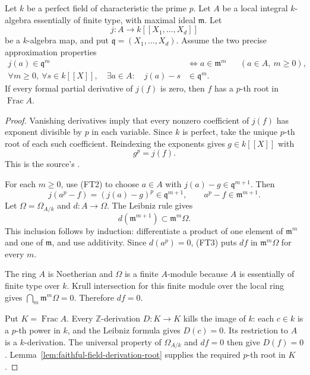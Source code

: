 \begin{srlemma}\label{lem:faithful-local-series-root}
Let \(k\) be a perfect field of characteristic the prime \(p\).
Let \(A\) be a local integral \(k\)-algebra essentially of
finite type, with maximal ideal \(\mathfrak m\).
Let
\[
                   j:A\longrightarrow k[[X_1,\ldots,X_d]]
\]
be a \(k\)-algebra map, and put
\(\mathfrak q=(X_1,\ldots,X_d)\).
Assume the two precise approximation properties
\[
 \begin{aligned}
 j(a)\in\mathfrak q^m
             &\iff a\in\mathfrak m^m
                                  &&(a\in A,\ m\ge0),\\
 \forall m\ge0,\ \forall s\in k[[X]],\quad
 \exists a\in A:\quad j(a)-s&\in\mathfrak q^m .
 \end{aligned}
 \tag{FT2}\label{eq:faithful-Taylor-properties}
\]
If every formal partial derivative of \(j(f)\) is zero,
then \(f\) has a \(p\)-th root in \(\operatorname{Frac}A\).
\end{srlemma}
\begin{proof}
Vanishing derivatives imply that every nonzero coefficient
of \(j(f)\) has exponent divisible by \(p\) in each variable.
Since \(k\) is perfect, take the unique \(p\)-th root of
each such coefficient.  Reindexing the exponents gives
\(g\in k[[X]]\) with
\[
                                 g^p=j(f).
\]
This is the source's
.

For each \(m\ge0\), use (FT2) to choose \(a\in A\) with
\(j(a)-g\in\mathfrak q^{m+1}\).
Then
\[
        j(a^p-f)=(j(a)-g)^p\in\mathfrak q^{m+1},
            \qquad a^p-f\in\mathfrak m^{m+1}.
 \tag{FT3}\label{eq:faithful-Taylor-p-approximation}
\]
Let \(\Omega=\Omega_{A/k}\) and \(d:A\to\Omega\).
The Leibniz rule gives
\[
                          d(\mathfrak m^{m+1})
                                     \subset\mathfrak m^m\Omega.
\]
This inclusion follows by induction: differentiate a
product of one element of \(\mathfrak m^m\) and one of
\(\mathfrak m\), and use additivity.
Since \(d(a^p)=0\), (FT3) puts \(df\) in
\(\mathfrak m^m\Omega\) for every \(m\).

The ring \(A\) is Noetherian and \(\Omega\) is a finite
\(A\)-module because \(A\) is essentially of finite type
over \(k\).
Krull intersection for this finite module over the local
ring gives \(\bigcap_m\mathfrak m^m\Omega=0\).
Therefore \(df=0\).

Put \(K=\operatorname{Frac}A\).
Every \(\mathbb Z\)-derivation \(D:K\to K\) kills the
image of \(k\): each \(c\in k\) is a \(p\)-th power in \(k\),
and the Leibniz formula gives \(D(c)=0\).
Its restriction to \(A\) is a \(k\)-derivation.
The universal property of \(\Omega_{A/k}\) and \(df=0\)
then give \(D(f)=0\).
Lemma~\ref{lem:faithful-field-derivation-root} supplies
the required \(p\)-th root in \(K\).
\end{proof}

